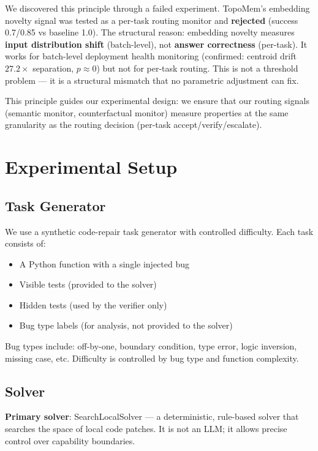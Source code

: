 \documentclass[11pt,a4paper]{article}
\begin{document}
We discovered this principle through a failed experiment. TopoMem's embedding novelty signal was tested as a per-task routing monitor and \textbf{rejected} (success 0.7/0.85 vs baseline 1.0). The structural reason: embedding novelty measures \textbf{input distribution shift} (batch-level), not \textbf{answer correctness} (per-task). It works for batch-level deployment health monitoring (confirmed: centroid drift $27.2\times$ separation, $p \approx 0$) but not for per-task routing. This is not a threshold problem --- it is a structural mismatch that no parametric adjustment can fix.

This principle guides our experimental design: we ensure that our routing signals (semantic monitor, counterfactual monitor) measure properties at the same granularity as the routing decision (per-task accept/verify/escalate).

\section{Experimental Setup}

\subsection{Task Generator}

We use a synthetic code-repair task generator with controlled difficulty. Each task consists of:
\begin{itemize}
    \item A Python function with a single injected bug
    \item Visible tests (provided to the solver)
    \item Hidden tests (used by the verifier only)
    \item Bug type labels (for analysis, not provided to the solver)
\end{itemize}

Bug types include: off-by-one, boundary condition, type error, logic inversion, missing case, etc. Difficulty is controlled by bug type and function complexity.

\subsection{Solver}

\textbf{Primary solver}: SearchLocalSolver --- a deterministic, rule-based solver that searches the space of local code patches. It is not an LLM; it allows precise control over capability boundaries.
\end{document}
